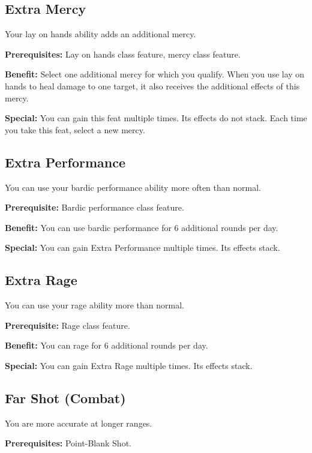 \subsection{Extra Mercy}

				
Your lay on hands ability adds an additional mercy.
				
\textbf{Prerequisites:} Lay on hands class feature, mercy class feature.
				
\textbf{Benefit:} Select one additional mercy for which you qualify. When you use lay on hands to heal damage to one target, it also receives the additional effects of this mercy.
				
\textbf{Special:} You can gain this feat multiple times. Its effects do not stack. Each time you take this feat, select a new mercy. 
				
\subsection{Extra Performance}

				
You can use your bardic performance ability more often than normal.
				
\textbf{Prerequisite:} Bardic performance class feature.
				
\textbf{Benefit:} You can use bardic performance for 6 additional rounds per day.
				
\textbf{Special:} You can gain Extra Performance multiple times. Its effects stack.
				
\subsection{Extra Rage}

				
You can use your rage ability more than normal.
				
\textbf{Prerequisite:} Rage class feature.
				
\textbf{Benefit:} You can rage for 6 additional rounds per day.
				
\textbf{Special:} You can gain Extra Rage multiple times. Its effects stack.
				
\subsection{Far Shot (Combat)}

				
You are more accurate at longer ranges.
				
\textbf{Prerequisites:} Point-Blank Shot.
				
